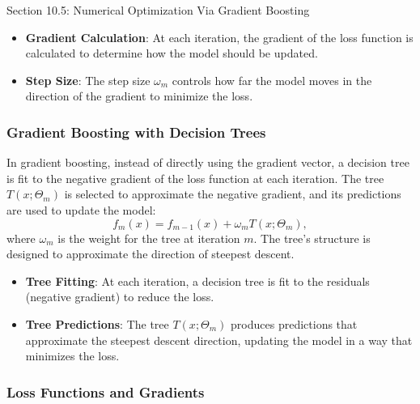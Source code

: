 \begin{notes}{Section 10.5: Numerical Optimization Via Gradient Boosting}
    \begin{highlight}
        \begin{itemize}
            \item \textbf{Gradient Calculation}: At each iteration, the gradient of the loss function is calculated to determine how the model should be updated.
            \item \textbf{Step Size}: The step size $\omega_m$ controls how far the model moves in the direction of the gradient to minimize the loss.
        \end{itemize}
    \end{highlight}
    
    \subsubsection*{Gradient Boosting with Decision Trees}
    
    In gradient boosting, instead of directly using the gradient vector, a decision tree is fit to the negative gradient of the loss function at each iteration. The tree $T(x; \Theta_m)$ is selected 
    to approximate the negative gradient, and its predictions are used to update the model:
    \[
    f_m(x) = f_{m-1}(x) + \omega_m T(x; \Theta_m),
    \]
    where $\omega_m$ is the weight for the tree at iteration $m$. The tree's structure is designed to approximate the direction of steepest descent.
    
    \begin{highlight}
        \begin{itemize}
            \item \textbf{Tree Fitting}: At each iteration, a decision tree is fit to the residuals (negative gradient) to reduce the loss.
            \item \textbf{Tree Predictions}: The tree $T(x; \Theta_m)$ produces predictions that approximate the steepest descent direction, updating the model in a way that minimizes the loss.
        \end{itemize}
    \end{highlight}
    
    \subsubsection*{Loss Functions and Gradients}
    

\end{notes}
